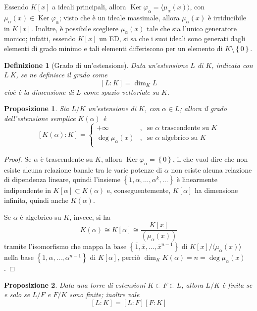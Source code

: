 \documentclass[12pt]{scrartcl}
\theoremstyle{style}
\newtheorem{definizione}{Definizione}[section]
\newtheorem{prop}{Proposizione}[section]
\numberwithin{equation}{subsection}
\begin{document}
\noindent Essendo $K[x]$ a ideali principali, allora $\operatorname{Ker} \varphi _\alpha  =\langle \mu _\alpha (x) \rangle$, con $\mu _\alpha (x) \in \operatorname{Ker} \varphi _\alpha $; visto che \`e un ideale massimale, allora $\mu _\alpha (x)$ \`e irriducibile in $K[x]$.
Inoltre, \`e possibile scegliere $\mu _\alpha (x)$ tale che sia l'unico generatore monico; infatti, essendo $K[x]$ un ED, si sa che i suoi ideali sono generati dagli elementi di grado minimo e tali elementi differiscono per un elemento di $K\setminus\left\{ 0 \right\} $.
\begin{definizione}
	[Grado di un'estensione]
	Data un'estensione $L$ di $K$, indicata con $L \ K$, se ne definisce il \textit{grado} come
	\[
		[L:K] = \dim _{K } L
	\] 
	cio\`e \`e la dimensione di $L$ come spazio vettoriale su $K$.
\end{definizione}
\begin{prop}\label{gradext}
	Sia $L / K$ un'estensione di $K$, con $\alpha \in L$; allora il grado dell'estensione semplice $K(\alpha )$ \`e
	\[
		[K(\alpha ):K]=\begin{cases}
			+\infty &,\ \text{ se } \alpha \text{ trascendente su } K\\
			\deg \mu _\alpha (x) &,\ \text{ se } \alpha \text{ algebrico su } K\\
		\end{cases}
	\] 
\end{prop}
\begin{proof}
	Se $\alpha $ \`e trascendente su $K$, allora $\operatorname{Ker} \varphi _\alpha  = \left\{ 0 \right\} $, il che vuol dire che non esiste alcuna relazione banale tra le varie potenze di $\alpha $ non esiste alcuna relazione di dipendenza lineare, quindi l'insieme $\left\{ 1, \alpha ,\ldots, \alpha ^k,\ldots \right\} $ \`e linearmente indipendente in $K[\alpha ] \subset K(\alpha )$ e, conseguentemente, $K[\alpha ]$ ha dimensione infinita, quindi anche $K(\alpha )$.

	Se $\alpha $ \`e algebrico su $K$, invece, si ha
	\[
		K(\alpha ) \cong K[\alpha ] \cong \frac{K[x]}{(\mu _\alpha (x))}
	\] 
	tramite l'isomorfismo che mappa la base $\left\{ \overline{1}, \overline{x},\ldots, \overline{x}^{n-1} \right\} $ di $K[x] / \langle \mu _\alpha (x) \rangle$ nella base $\left\{ 1 , \alpha  ,\ldots, \alpha  ^{n-1} \right\} $ di $K[\alpha ]$, perci\`o $\dim _K K(\alpha )= n = \deg \mu _\alpha (x)$.
\end{proof}
\begin{prop}
	\label{text}
	Data una torre di estensioni $K \subset  F \subset L$, allora $L / K$ \`e finita se e solo se $L / F$ e $F / K$ sono finite; inoltre vale
	\[
		[L:K] = [L:F] [F:K]
	\] 
\end{prop}
\end{document}
